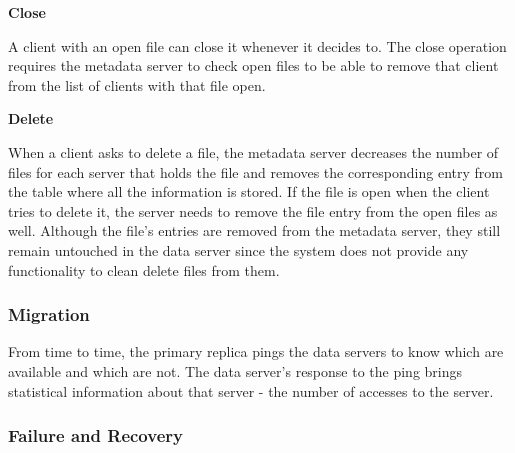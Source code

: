\bigskip
\textbf{Close}
\smallskip

A client with an open file can close it whenever it decides to. The close
operation requires the metadata server to check open files to be able to
remove that client from the list of clients with that file open.

\bigskip
\textbf{Delete}
\smallskip

When a client asks to delete a file, the metadata server decreases the
number of files for each server that holds the file and removes the 
corresponding entry from the table where all the information is stored.
If the file is open when the client tries to delete it, the server needs
to remove the file entry from the open files as well.
Although the file's entries are removed from the metadata server, they
still remain untouched in the data server since the system does not provide
any functionality to clean delete files from them.

\subsubsection{Migration}

From time to time, the primary replica pings the data servers to know
which are available and which are not. The data server's response to the ping
brings statistical information about that server - the number of accesses to
the server. 


\subsubsection{Failure and Recovery}

